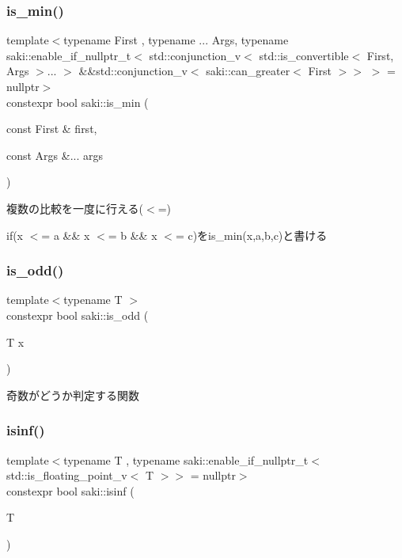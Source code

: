 \subsubsection{\texorpdfstring{is\+\_\+min()}{is\_min()}}
{\footnotesize\ttfamily template$<$typename First , typename ... Args, typename saki\+::enable\+\_\+if\+\_\+nullptr\+\_\+t$<$ std\+::conjunction\+\_\+v$<$ std\+::is\+\_\+convertible$<$ First, Args $>$... $>$ \&\&std\+::conjunction\+\_\+v$<$ saki\+::can\+\_\+greater$<$ First $>$$>$ $>$  = nullptr$>$ \\
constexpr bool saki\+::is\+\_\+min (\begin{DoxyParamCaption}\item[{const First \&}]{first,  }\item[{const Args \&...}]{args }\end{DoxyParamCaption})}



複数の比較を一度に行える($<$=) 

if(x $<$= a \&\& x $<$= b \&\& x $<$= c)をis\+\_\+min(x,a,b,c)と書ける \mbox{\label{namespacesaki_a03cf21b9e2231e956f8da966f1e09d70}} 
\subsubsection{\texorpdfstring{is\+\_\+odd()}{is\_odd()}}
{\footnotesize\ttfamily template$<$typename T $>$ \\
constexpr bool saki\+::is\+\_\+odd (\begin{DoxyParamCaption}\item[{T}]{x }\end{DoxyParamCaption})}



奇数がどうか判定する関数 

\mbox{\label{namespacesaki_a2168418bb30a857d2d018d0d05c7ace0}} 
\subsubsection{\texorpdfstring{isinf()}{isinf()}}
{\footnotesize\ttfamily template$<$typename T , typename saki\+::enable\+\_\+if\+\_\+nullptr\+\_\+t$<$ std\+::is\+\_\+floating\+\_\+point\+\_\+v$<$ T $>$$>$  = nullptr$>$ \\
constexpr bool saki\+::isinf (\begin{DoxyParamCaption}\item[{T}]{ }\end{DoxyParamCaption})}



